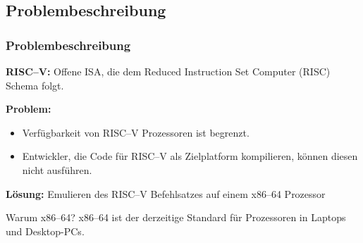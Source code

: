 \subsection{Problembeschreibung} %
\begin{frame}
    \frametitle{Problembeschreibung}

    \vspace{0.50cm}

    \textbf{RISC--V:} Offene ISA, die dem Reduced Instruction Set Computer (RISC) Schema folgt.

    \vspace{0.50cm}

    \textbf{Problem:}
    \begin{itemize}
        \item Verfügbarkeit von RISC--V Prozessoren ist begrenzt.
        \item Entwickler, die Code für RISC--V als Zielplatform kompilieren, können diesen nicht ausführen.
    \end{itemize}

    \vspace{0.50cm}

    \textbf{Lösung:} Emulieren des RISC--V Befehlsatzes auf einem x86--64 Prozessor

    \vspace{0.50cm}

    \begin{block}{Warum x86--64?}
        x86--64 ist der derzeitige Standard für Prozessoren in Laptops und Desktop-PCs.
    \end{block}
\end{frame}

